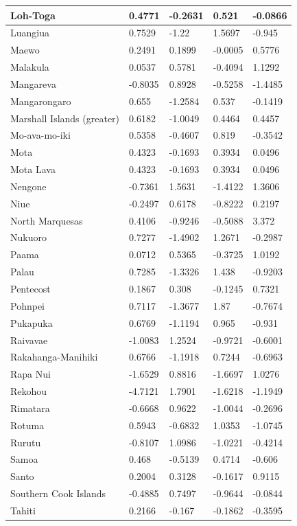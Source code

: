 \documentclass[a4paper,10pt]{article} %
\begin{document}
\begin{landscape}
\begin{longtable}{| p{2.6cm} |  p{2cm} | p{2cm}  | p{2cm}  | p{2cm}|}
Loh-Toga&0.4771&-0.2631&0.521&-0.0866\\ \hline
Luangiua&0.7529&-1.22&1.5697&-0.945\\ \hline
Maewo&0.2491&0.1899&-0.0005&0.5776\\ \hline
Malakula&0.0537&0.5781&-0.4094&1.1292\\ \hline
Mangareva&-0.8035&0.8928&-0.5258&-1.4485\\ \hline
Mangarongaro&0.655&-1.2584&0.537&-0.1419\\ \hline
Marshall Islands (greater)&0.6182&-1.0049&0.4464&0.4457\\ \hline
Mo-ava-mo-iki&0.5358&-0.4607&0.819&-0.3542\\ \hline
Mota&0.4323&-0.1693&0.3934&0.0496\\ \hline
Mota Lava&0.4323&-0.1693&0.3934&0.0496\\ \hline
Nengone&-0.7361&1.5631&-1.4122&1.3606\\ \hline
Niue&-0.2497&0.6178&-0.8222&0.2197\\ \hline
North Marquesas&0.4106&-0.9246&-0.5088&3.372\\ \hline
Nukuoro&0.7277&-1.4902&1.2671&-0.2987\\ \hline
Paama&0.0712&0.5365&-0.3725&1.0192\\ \hline
Palau&0.7285&-1.3326&1.438&-0.9203\\ \hline
Pentecost&0.1867&0.308&-0.1245&0.7321\\ \hline
Pohnpei&0.7117&-1.3677&1.87&-0.7674\\ \hline
Pukapuka&0.6769&-1.1194&0.965&-0.931\\ \hline
Raivavae&-1.0083&1.2524&-0.9721&-0.6001\\ \hline
Rakahanga-Manihiki&0.6766&-1.1918&0.7244&-0.6963\\ \hline
Rapa Nui&-1.6529&0.8816&-1.6697&1.0276\\ \hline
Rekohou&-4.7121&1.7901&-1.6218&-1.1949\\ \hline
Rimatara&-0.6668&0.9622&-1.0044&-0.2696\\ \hline
Rotuma&0.5943&-0.6832&1.0353&-1.0745\\ \hline
Rurutu&-0.8107&1.0986&-1.0221&-0.4214\\ \hline
Samoa&0.468&-0.5139&0.4714&-0.606\\ \hline
Santo&0.2004&0.3128&-0.1617&0.9115\\ \hline
Southern Cook Islands&-0.4885&0.7497&-0.9644&-0.0844\\ \hline
Tahiti&0.2166&-0.167&-0.1862&-0.3595\\ \hline

\end{longtable}
\end{landscape}
\end{document}
